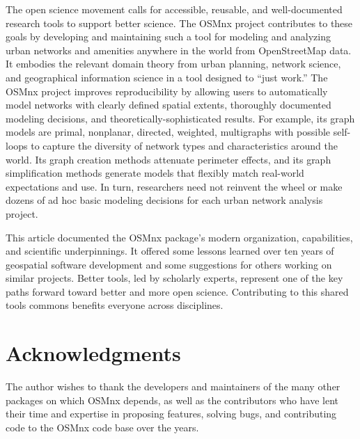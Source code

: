 \documentclass[12pt,letterpaper]{article} %
\begin{document}
The open science movement calls for accessible, reusable, and well-documented research tools to support better science. The OSMnx project contributes to these goals by developing and maintaining such a tool for modeling and analyzing urban networks and amenities anywhere in the world from OpenStreetMap data. It embodies the relevant domain theory from urban planning, network science, and geographical information science in a tool designed to \enquote{just work.} The OSMnx project improves reproducibility by allowing users to automatically model networks with clearly defined spatial extents, thoroughly documented modeling decisions, and theoretically-sophisticated results. For example, its graph models are primal, nonplanar, directed, weighted, multigraphs with possible self-loops to capture the diversity of network types and characteristics around the world. Its graph creation methods attenuate perimeter effects, and its graph simplification methods generate models that flexibly match real-world expectations and use. In turn, researchers need not reinvent the wheel or make dozens of ad hoc basic modeling decisions for each urban network analysis project.

This article documented the OSMnx package's modern organization, capabilities, and scientific underpinnings. It offered some lessons learned over ten years of geospatial software development and some suggestions for others working on similar projects. Better tools, led by scholarly experts, represent one of the key paths forward toward better and more open science. Contributing to this shared tools commons benefits everyone across disciplines.

\section*{Acknowledgments}

The author wishes to thank the developers and maintainers of the many other packages on which OSMnx depends, as well as the contributors who have lent their time and expertise in proposing features, solving bugs, and contributing code to the OSMnx code base over the years.


\setlength{\bibsep}{0.00cm plus 0.05cm} %


\end{document}
